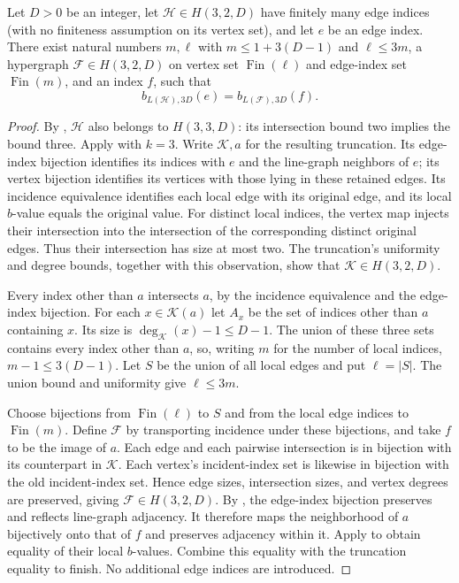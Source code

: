 \begin{helper}
Let $D>0$ be an integer, let $\mathcal H\in H(3,2,D)$ have finitely
many edge indices (with no finiteness assumption on its vertex set), and
let $e$ be an edge index. There exist natural numbers $m,\ell$ with
$m\le 1+3(D-1)$ and $\ell\le 3m$, a hypergraph
$\mathcal F\in H(3,2,D)$ on vertex set $\operatorname{Fin}(\ell)$ and
edge-index set $\operatorname{Fin}(m)$, and an index $f$, such that
\[
b_{L(\mathcal H),3D}(e)=b_{L(\mathcal F),3D}(f).
\]
\end{helper}
\begin{proof}
By , $\mathcal H$ also belongs to $H(3,3,D)$:
its intersection bound two implies the bound three. Apply
 with $k=3$.
Write $\mathcal K,a$ for the resulting truncation. Its edge-index
bijection identifies its indices with $e$ and the line-graph neighbors of
$e$; its vertex bijection identifies its vertices with those lying in
these retained edges. Its incidence equivalence identifies each local
edge with its original edge, and its local $b$-value equals the original
value. For distinct local indices, the vertex map injects their
intersection into the intersection of the corresponding distinct original
edges. Thus their intersection has size at most two. The truncation's
uniformity and degree bounds, together with this observation, show that
$\mathcal K\in H(3,2,D)$.

Every index other than $a$ intersects $a$, by the incidence equivalence
and the edge-index bijection. For each $x\in\mathcal K(a)$ let $A_x$ be
the set of indices other than $a$ containing $x$. Its size is
$\deg_{\mathcal K}(x)-1\le D-1$. The union of these three sets contains
every index other than $a$, so, writing $m$ for the number of local
indices, $m-1\le 3(D-1)$. Let $S$ be the union of all local edges and
put $\ell=|S|$. The union bound and uniformity give $\ell\le 3m$.

Choose bijections from $\operatorname{Fin}(\ell)$ to $S$ and from the
local edge indices to $\operatorname{Fin}(m)$. Define $\mathcal F$ by
transporting incidence under these bijections, and take $f$ to be the
image of $a$. Each edge and each pairwise intersection is in bijection
with its counterpart in $\mathcal K$. Each vertex's incident-index set
is likewise in bijection with the old incident-index set. Hence edge
sizes, intersection sizes, and vertex degrees are preserved, giving
$\mathcal F\in H(3,2,D)$. By , the
edge-index bijection preserves and reflects line-graph adjacency. It
therefore maps the neighborhood of $a$ bijectively onto that of $f$ and
preserves adjacency within it. Apply
 to obtain
equality of their local $b$-values. Combine this equality with the
truncation equality to finish. No additional edge indices are introduced.
\end{proof}
